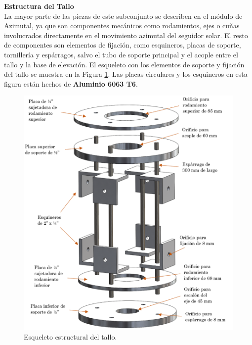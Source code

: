 \textbf{Estructura del Tallo}\\

La mayor parte de las piezas de este subconjunto se describen en el módulo de Azimutal, ya que son componentes mecánicos como rodamientos, ejes o cuñas involucrados directamente en el movimiento azimutal del seguidor solar. El resto de componentes son elementos de fijación, como esquineros, placas de soporte, tornillería y espárragos, salvo el tubo de soporte principal y el acople entre el tallo y la base de elevación. El esqueleto con los elementos de soporte y fijación del tallo se muestra en la Figura \ref{fig:tal1}. Las placas circulares y los esquineros en esta figura están hechos de \textbf{Aluminio 6063 T6}.

\begin{figure}[H]
	\centering
	\includegraphics[width=14cm]{imagenes/tal1}
	\caption{Esqueleto estructural del tallo.}
	\label{fig:tal1}
\end{figure}


